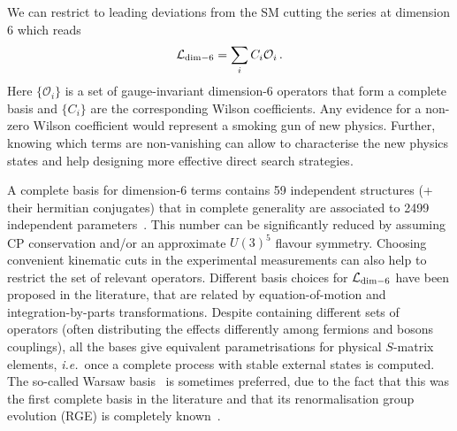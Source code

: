 We can restrict to leading deviations from the SM cutting the series at dimension 6 which reads
\begin{equation}
 \mathcal{L}_{\rm dim-6} = \sum_i C_i \mathcal{O}_i\,.
\end{equation} 
Here $\{\mathcal{O}_i\}$ is a set of gauge-invariant dimension-6 operators that form a complete basis and $\{C_i\}$ are the corresponding Wilson coefficients.
%
Any evidence for a non-zero Wilson coefficient would represent a smoking gun of new physics.
Further, knowing which terms are non-vanishing can allow to characterise the new physics states and help designing more effective direct search strategies.


A complete basis for dimension-6 terms contains 59 independent structures (+ their hermitian conjugates) that in complete generality are associated to 2499 independent parameters~\cite{Alonso:2013hga}.
This number can be significantly reduced by assuming CP conservation and/or an approximate $U(3)^5$ flavour symmetry.
Choosing convenient kinematic cuts in the experimental measurements can also help to restrict the set of relevant operators.
Different basis choices for $\mathcal{L}_{\rm dim-6}$ have been proposed in the literature, that are related by equation-of-motion and integration-by-parts transformations. 
Despite containing different sets of operators (often distributing the effects differently among fermions and bosons couplings), all the bases give equivalent parametrisations for physical $S$-matrix elements, \emph{i.e.}\ once a complete process with stable external states is computed. 
The so-called Warsaw basis~\cite{Grzadkowski:2010es} is sometimes preferred, due to the fact that this was the first complete basis in the literature and that its renormalisation group evolution (RGE) is completely known~\cite{Jenkins:2013zja,Jenkins:2013wua,Alonso:2013hga,Grojean:2013kd,Alonso:2014zka}.

